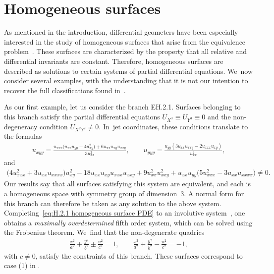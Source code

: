 \documentclass[10pt,a4paper]{amsart}
\numberwithin{equation}{section}
\begin{document}
\section{Homogeneous surfaces}\label{sec:homogeneous surfaces}

As mentioned in the introduction, differential geometers have been especially interested in the study of homogeneous surfaces that arise from the equivalence problem~\cite{ADV-1997,DKR-1996,EE-1999}. These surfaces are characterized by the property that all relative and differential invariants are constant. Therefore, homogeneous surfaces are described as solutions to certain systems of partial differential equations. We~now consider several examples, with the understanding that it is not our intention to recover the full classifications found in~\cite{ADV-1997,DKR-1996,EE-1999}.

\begin{Example}%
As our first example, let us consider the branch EH.2.1. Surfaces belonging to this branch satisfy the partial differential equations $U_{X^3}\equiv U_{Y^3} \equiv 0$ and the non-degeneracy condition $U_{X^2Y^2}\neq 0$. In~jet coordinates, these conditions translate to the formulas
%
\begin{gather}\label{eq:H.2.1 homogeneous surface PDE}
u_ {xyy}=\frac{u_{xxx} \big(u_{xx} u_{yy}-4 u_ {xy}^2\big)+6 u_{xx} u_{xy}u_{xxy}}{3 u_ {xx}^2},\qquad
u_ {yyy}=\frac{u_{yy} (3 u_{xx} u_{xxy}-2u_{xxx} u_{xy})}{u_ {xx}^2},
\end{gather}
%
and
\begin{gather*}
\big(4 u_{xxx}^2\!+3 u_{xx} u_{xxxx}\big) u_{xy}^2-18 u_{xx} u_{xy} u_{xxx}u_{xxy} \!+9 u_{xx}^2 u_{xxy}^2\!+u_{xx}u_{yy}\big(5 u_{xxx}^2\!-3 u_{xx}u_{xxxx}\big) \neq0.
\end{gather*}
Our results say that all surfaces satisfying this system are equivalent, and each is a homogeneous space with symmetry group of dimension~3. A normal form for this branch can therefore be taken as any solution to the above system. Completing~\eqref{eq:H.2.1 homogeneous surface PDE} to an involutive system~\cite{S-2010}, one obtains a \emph{maximally overdetermined} fifth order system, which can be solved using the Frobenius theorem. We~find that the non-degenerate quadrics
\begin{gather*}
\frac{x^2}{a^2}+\frac{y^2}{b^2}\pm \frac{u^2}{c^2}=1,\qquad
\frac{x^2}{a^2}+\frac{y^2}{b^2}-\frac{u^2}{c^2}=-1,
\end{gather*}
with $c\neq 0$, satisfy the constraints of this branch. These surfaces correspond to case (1) in \cite[Theorem 1.1]{ADV-1997}.
\end{Example}
\end{document}
